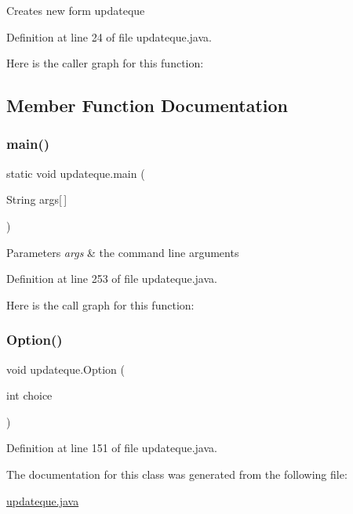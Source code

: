 Creates new form updateque 

Definition at line 24 of file updateque.\+java.

Here is the caller graph for this function\+:


\subsection{Member Function Documentation}
\mbox{\label{classupdateque_a23b646977558bf1eaed30f2d08b3b16a}} 
\subsubsection{\texorpdfstring{main()}{main()}}
{\footnotesize\ttfamily static void updateque.\+main (\begin{DoxyParamCaption}\item[{String}]{args\mbox{[}$\,$\mbox{]} }\end{DoxyParamCaption})\hspace{0.3cm}{\ttfamily [static]}}


\begin{DoxyParams}{Parameters}
{\em args} & the command line arguments \\
\hline
\end{DoxyParams}


Definition at line 253 of file updateque.\+java.

Here is the call graph for this function\+:
\mbox{\label{classupdateque_ab70d99a1a03205a7e4587d32b4e7bfa5}} 
\subsubsection{\texorpdfstring{Option()}{Option()}}
{\footnotesize\ttfamily void updateque.\+Option (\begin{DoxyParamCaption}\item[{int}]{choice }\end{DoxyParamCaption})}



Definition at line 151 of file updateque.\+java.



The documentation for this class was generated from the following file\+:\begin{DoxyCompactItemize}
\item 
\mbox{\hyperlink{updateque_8java}{updateque.\+java}}\end{DoxyCompactItemize}

